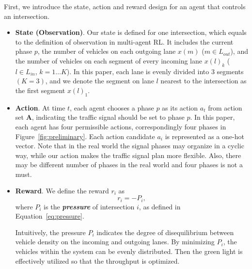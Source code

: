 First, we introduce the state, action and reward design for an agent that controls an intersection.
\begin{itemize}[wide,noitemsep,topsep=0pt]
    \item \textbf{State (Observation)}. Our state is defined for one intersection, which equals to the definition of observation in multi-agent RL. It includes the current phase $p$, the number of vehicles on each outgoing lane $x(m)$ ($m\in L_{out}$), and the number of vehicles on each segment of every incoming lane $x(l)_k$ ($l\in L_{in}$, $k=1\dots K$). In this paper, each lane is evenly divided into 3 segments $(K=3)$, and we denote the segment on lane $l$ nearest to the intersection as the first segment $x(l)_1$.
    \item \textbf{Action}. At time $t$, each agent chooses a phase $p$ as its action $a_t$ from action set $\pmb{A}$, indicating the traffic signal should be set to phase $p$. In this paper, each agent has four permissible actions, correspondingly four phases in Figure~\ref{fig:preliminary}. Each action candidate $a_{i}$ is represented as a one-hot vector. Note that in the real world the signal phases may organize in a cyclic way, while our action makes the traffic signal plan more flexible. Also, there may be different number of phases in the real world and four phases is not a must.
    \item \textbf{Reward}. We define the reward $r_i$ as
        \begin{equation}
            \label{eq:reward-detail}
            r_i  = - P_i,
        \end{equation}
    where $P_i$ is the  \textit{\textbf{pressure}} of intersection $i$, as defined in Equation~\eqref{eq:pressure}.
    
    Intuitively, the pressure $P_i$ indicates the degree of disequilibrium between vehicle density on the incoming and outgoing lanes. By minimizing $P_i$, the vehicles within the system can be evenly distributed. Then the green light is effectively utilized so that the throughput is optimized.
    
\end{itemize}

